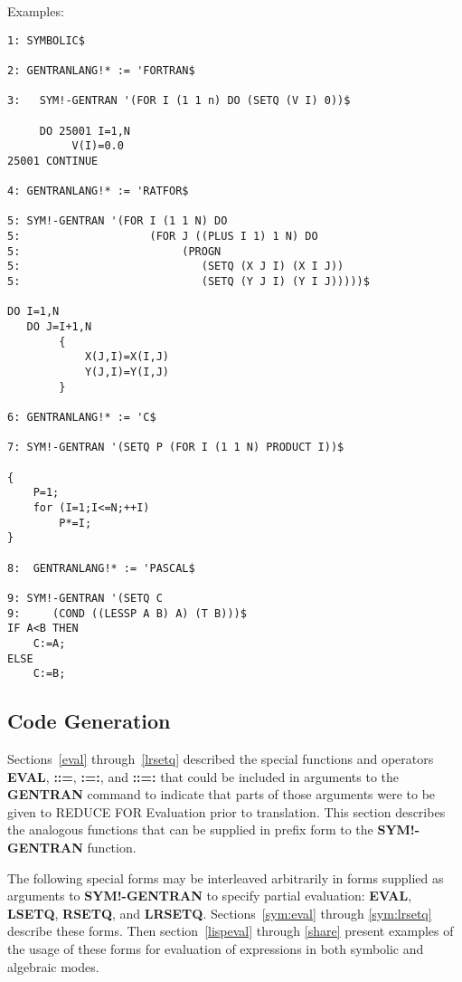 \begin{describe}{Examples:}
\begin{verbatim}
1: SYMBOLIC$ 

2: GENTRANLANG!* := 'FORTRAN$

3:   SYM!-GENTRAN '(FOR I (1 1 n) DO (SETQ (V I) 0))$

     DO 25001 I=1,N
          V(I)=0.0
25001 CONTINUE

4: GENTRANLANG!* := 'RATFOR$

5: SYM!-GENTRAN '(FOR I (1 1 N) DO 
5:                    (FOR J ((PLUS I 1) 1 N) DO 
5:                         (PROGN 
5:                            (SETQ (X J I) (X I J)) 
5:                            (SETQ (Y J I) (Y I J)))))$ 

DO I=1,N
   DO J=I+1,N
        {
            X(J,I)=X(I,J)
            Y(J,I)=Y(I,J)
        }

6: GENTRANLANG!* := 'C$ 

7: SYM!-GENTRAN '(SETQ P (FOR I (1 1 N) PRODUCT I))$

{
    P=1;
    for (I=1;I<=N;++I)
        P*=I;
}

8:  GENTRANLANG!* := 'PASCAL$

9: SYM!-GENTRAN '(SETQ C
9:     (COND ((LESSP A B) A) (T B)))$
IF A<B THEN
    C:=A;
ELSE
    C:=B;

\end{verbatim}
\end{describe}

\subsection{Code Generation}
\label{sym:cg}
Sections~\ref{eval} through~\ref{lrsetq} described the special functions and
operators {\bf EVAL}, {\bf ::=}, {\bf :=:}, and {\bf ::=:} that could be
included in arguments to the {\bf GENTRAN} command to indicate
that parts of those arguments were to be given to REDUCE
FOR Evaluation prior to translation.  This section describes the
analogous functions that can be supplied in prefix form to the
{\bf SYM!-GENTRAN} function.

The following special forms may be interleaved arbitrarily in forms
supplied as arguments to {\bf SYM!-GENTRAN} to specify partial
evaluation:  {\bf EVAL}, {\bf LSETQ}, {\bf RSETQ}, and {\bf LRSETQ}.
Sections~\ref{sym:eval} through \ref{sym:lrsetq} describe these forms.  Then
section~\ref{lispeval} through \ref{share}
present examples of the usage of these
forms for evaluation of expressions in both symbolic and algebraic modes.

